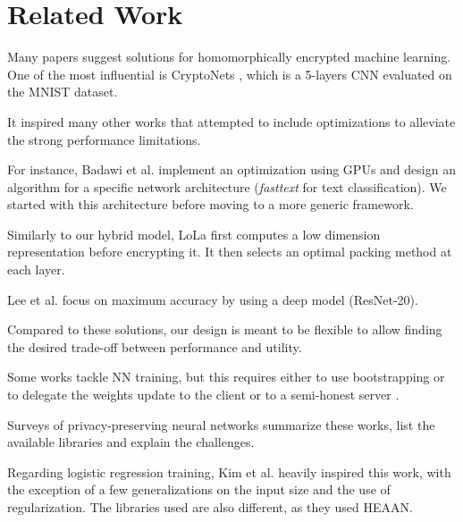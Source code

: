 \documentclass[a4paper,11pt,oneside]{report}
\begin{document}
\chapter{Related Work}



Many papers suggest solutions for homomorphically encrypted machine learning.
One of the most influential is CryptoNets \cite{dowlin_cryptonets_2016}, which is a 5-layers CNN evaluated on the MNIST dataset.

It inspired many other works that attempted to include optimizations to alleviate the strong performance limitations.

For instance, Badawi et al. \cite{badawi_privft_2019, badawi_towards_2020} implement an optimization using GPUs and design an algorithm for a specific network architecture (\emph{fasttext} for text classification). 
We started with this architecture before moving to a more generic framework.

Similarly to our hybrid model, LoLa \cite{brutzkus_low_2019} first computes a low dimension representation before encrypting it. 
It then selects an optimal packing method at each layer.

Lee et al. \cite{lee_privacy-preserving_2021} focus on maximum accuracy by using a deep model (ResNet-20).

Compared to these solutions, our design is meant to be flexible to allow finding the desired trade-off between performance and utility.

Some works tackle NN training, but this requires either to use bootstrapping or to delegate the weights update to the client \cite{mihara_neural_2020} or to a semi-honest server \cite{bellafqira_secure_2018}.

Surveys \cite{pulido-gaytan_privacy-preserving_2021,podschwadt_sok_2022} of privacy-preserving neural networks summarize these works, list the available libraries and explain the challenges.

Regarding logistic regression training, Kim et al. \cite{kim_logistic_2018} heavily inspired this work, with the exception of a few generalizations on the input size and the use of regularization.
The libraries used are also different, as they used HEAAN.
\end{document}
